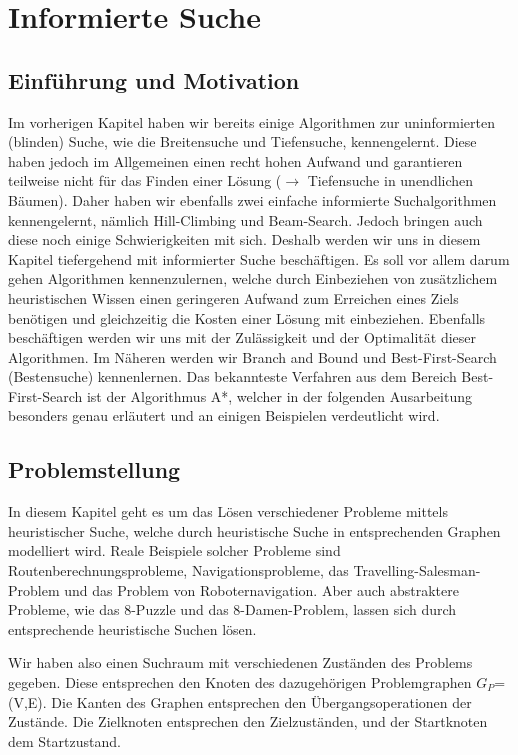 
\chapter{Informierte Suche}

\section{Einf\"uhrung und Motivation}
Im vorherigen Kapitel haben wir bereits einige Algorithmen zur uninformierten (\glqq blinden\grqq) Suche, wie die Breitensuche und Tiefensuche, kennengelernt. Diese haben jedoch im Allgemeinen einen recht hohen Aufwand und garantieren teilweise nicht für das Finden einer Lösung ($\rightarrow$ Tiefensuche in unendlichen Bäumen). Daher haben wir ebenfalls zwei einfache informierte Suchalgorithmen kennengelernt, nämlich Hill-Climbing und Beam-Search. Jedoch bringen auch diese noch einige Schwierigkeiten mit sich.
Deshalb werden wir uns in diesem Kapitel tiefergehend mit informierter Suche beschäftigen.
Es soll vor allem darum gehen Algorithmen kennenzulernen, welche durch Einbeziehen von zusätzlichem heuristischen Wissen einen geringeren Aufwand zum Erreichen eines Ziels benötigen und gleichzeitig die Kosten einer Lösung mit einbeziehen.
Ebenfalls beschäftigen werden wir uns mit der Zulässigkeit und der Optimalität dieser Algorithmen.
Im Näheren werden wir Branch and Bound und Best-First-Search (Bestensuche) kennenlernen. Das bekannteste Verfahren aus dem Bereich Best-First-Search ist der Algorithmus A*, welcher in der folgenden Ausarbeitung besonders genau erläutert und an einigen Beispielen verdeutlicht wird.



\section{Problemstellung}

In diesem Kapitel geht es um das Lösen verschiedener Probleme mittels heuristischer Suche, welche durch heuristische Suche in entsprechenden Graphen modelliert wird.
Reale Beispiele solcher Probleme sind Routenberechnungsprobleme, Navigationsprobleme, das Travelling-Salesman-Problem und das Problem von Roboternavigation. Aber auch abstraktere Probleme, wie das 8-Puzzle und das 8-Damen-Problem, lassen sich durch entsprechende heuristische Suchen lösen.

Wir haben also einen Suchraum mit verschiedenen Zuständen des Problems gegeben. Diese entsprechen den Knoten des dazugehörigen Problemgraphen $G_{P}$=(V,E).
Die Kanten des Graphen entsprechen den Übergangsoperationen der Zustände.
Die Zielknoten entsprechen den Zielzuständen, und der Startknoten dem Startzustand.

